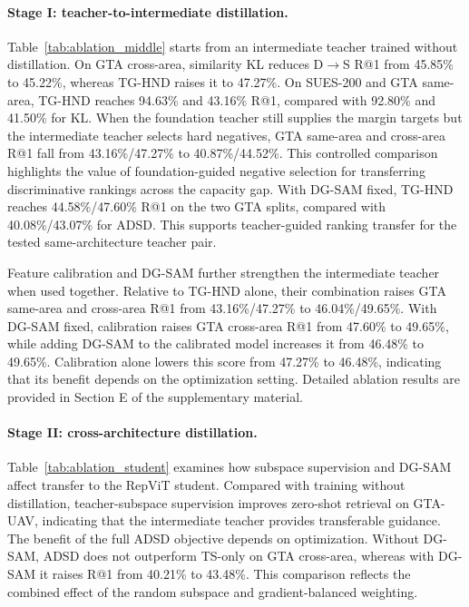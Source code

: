 \paragraph{Stage I: teacher-to-intermediate distillation.}
Table~\ref{tab:ablation_middle} starts from an intermediate teacher trained without distillation. On GTA cross-area, similarity KL reduces D$\rightarrow$S R@1 from 45.85\% to 45.22\%, whereas TG-HND raises it to 47.27\%. On SUES-200 and GTA same-area, TG-HND reaches 94.63\% and 43.16\% R@1, compared with 92.80\% and 41.50\% for KL. When the foundation teacher still supplies the margin targets but the intermediate teacher selects hard negatives, GTA same-area and cross-area R@1 fall from 43.16\%/47.27\% to 40.87\%/44.52\%. This controlled comparison highlights the value of foundation-guided negative selection for transferring discriminative rankings across the capacity gap. With DG-SAM fixed, TG-HND reaches 44.58\%/47.60\% R@1 on the two GTA splits, compared with 40.08\%/43.07\% for ADSD. This supports teacher-guided ranking transfer for the tested same-architecture teacher pair.

Feature calibration and DG-SAM further strengthen the intermediate teacher when used together. Relative to TG-HND alone, their combination raises GTA same-area and cross-area R@1 from 43.16\%/47.27\% to 46.04\%/49.65\%. With DG-SAM fixed, calibration raises GTA cross-area R@1 from 47.60\% to 49.65\%, while adding DG-SAM to the calibrated model increases it from 46.48\% to 49.65\%. Calibration alone lowers this score from 47.27\% to 46.48\%, indicating that its benefit depends on the optimization setting. Detailed ablation results are provided in Section E of the supplementary material.

\paragraph{Stage II: cross-architecture distillation.}
Table~\ref{tab:ablation_student} examines how subspace supervision and DG-SAM affect transfer to the RepViT student. Compared with training without distillation, teacher-subspace supervision improves zero-shot retrieval on GTA-UAV, indicating that the intermediate teacher provides transferable guidance. The benefit of the full ADSD objective depends on optimization. Without DG-SAM, ADSD does not outperform TS-only on GTA cross-area, whereas with DG-SAM it raises R@1 from 40.21\% to 43.48\%. This comparison reflects the combined effect of the random subspace and gradient-balanced weighting.

